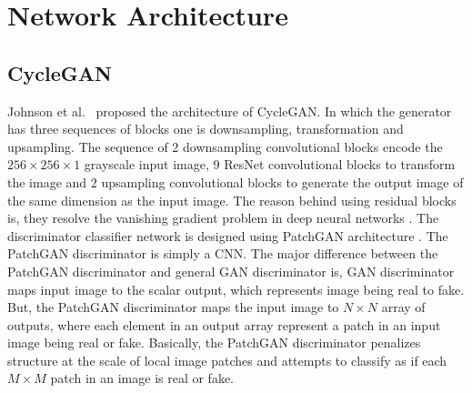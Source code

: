 \newpage

\section{Network Architecture}\label{NetworkArchitecture}

\subsection{\ac{CycleGAN}}

Johnson et al.\ \cite{johnson2016perceptual} proposed the architecture of \ac{CycleGAN}. In which the generator has three sequences of blocks one is downsampling, transformation and upsampling. The sequence of 2 downsampling convolutional blocks encode the $256 \times 256 \times 1$ grayscale input image, 9 \ac{ResNet} convolutional blocks to transform the image and 2 upsampling convolutional blocks to generate the output image of the same dimension as the input image. The reason behind using residual blocks is, they resolve the vanishing gradient problem in deep neural networks \cite{he2015deep}. The discriminator classifier network is designed using PatchGAN architecture \cite{isola2018imagetoimage} \cite{li2016precomputed}. The PatchGAN discriminator is simply a \ac{CNN}. The major difference between the PatchGAN discriminator and general \ac{GAN} discriminator is, \ac{GAN} discriminator maps input image to the scalar output, which represents image being real to fake. But, the PatchGAN discriminator maps the input image to $N \times N$ array of outputs, where each element in an output array represent a patch in an input image being real or fake. Basically, the PatchGAN discriminator penalizes structure at the scale of local image patches and attempts to classify as if each $M \times M$ patch in an image is real or fake.


